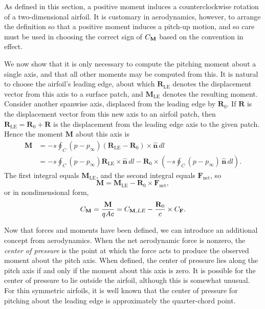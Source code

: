 \documentclass[10pt,fleqn,reqno]{article}
\newcommand\defn[1]{\emph{#1}}
\begin{document}
As defined in this section, a positive moment induces a counterclockwise rotation of a two-dimensional airfoil.  It is customary in aerodynamics, however, to arrange the definition so that a positive moment induces a pitch-up motion, and so care must be used in choosing the correct sign of $C_{\textbf M}$ based on the convention in effect.

We now show that it is only necessary to compute the pitching moment about a single axis, and that all other moments may be computed from this.  It is natural to choose the airfoil's leading edge, about which $\mathbf R_\text{LE}$ denotes the displacement vector from this axis to a surface patch, and $\mathbf M_\text{LE}$ denotes the resulting moment.  Consider another spanwise axis, displaced from the leading edge by $\mathbf R_0$.  If $\mathbf R$ is the displacement vector from this new axis to an airfoil patch, then $\mathbf R_\text{LE}=\mathbf R_0+\mathbf R$ is the displacement from the leading edge axis to the given patch. Hence the moment $\mathbf M$ about this axis is
\begin{align*}
\mathbf M &= -s\oint_C(p-p_\infty)(\mathbf R_\text{LE}-\mathbf R_0)\times\hat{\mathbf n}\,dl\\
&=-s\oint_C(p-p_\infty)\mathbf R_\text{LE}\times\hat{\mathbf n}\,dl-\mathbf R_0\times\left(-s\oint_C(p-p_\infty)\,\hat{\mathbf n}\,dl\right).
\end{align*}
The first integral equals $\mathbf M_\text{LE}$, and the second integral equals $\mathbf F_\text{net}$, so \[\mathbf M=\mathbf M_\text{LE}-\mathbf R_0\times\mathbf F_\text{net},\] or in nondimensional form, \[C_{\textbf M} = \frac{\mathbf M}{qAc} = C_{\textbf M,LE}-\frac{\mathbf R_0}{c}\times C_{\mathbf F}.\]

Now that forces and moments have been defined, we can introduce an additional concept from aerodynamics.  When the net aerodynamic force is nonzero, the \defn{center of pressure} is the point at which the force acts to produce the observed moment about the pitch axis.  When defined, the center of pressure lies along the pitch axis if and only if the moment about this axis is zero.  It is possible for the center of pressure to lie outside the airfoil, although this is somewhat unusual.  For thin symmetric airfoils, it is well known that the center of pressure for pitching about the leading edge is approximately the quarter-chord point.

\end{document}
